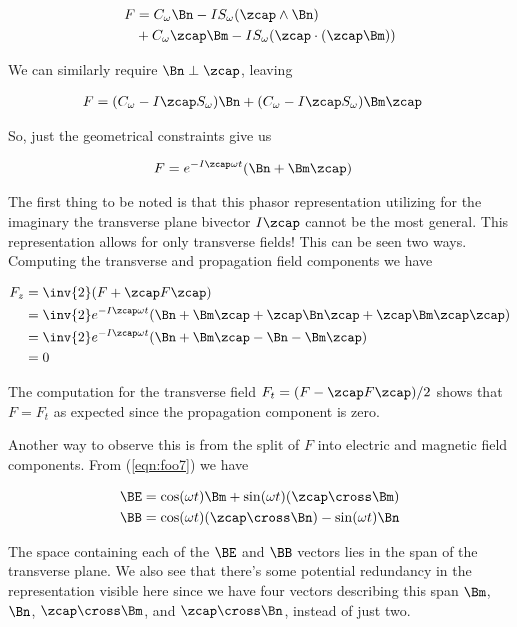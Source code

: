 \begin{align*}
F &= 
 C_\omega \Bn - I S_\omega (\zcap \wedge \Bn)  \\
&+ C_\omega \zcap \Bm - I S_\omega (\zcap \cdot (\zcap \Bm)) \\
\end{align*}

We can similarly require $\Bn \perp \zcap$, leaving

\begin{align}\label{eqn:foo7}
F &= (C_\omega - I \zcap S_\omega ) \Bn  + (C_\omega - I \zcap S_\omega) \Bm \zcap
\end{align}

So, just the geometrical constraints give us

\begin{align}\label{eqn:foo6}
F &= e^{-I\zcap \omega t}(\Bn + \Bm \zcap)
\end{align}

The first thing to be noted is that this phasor representation utilizing for the imaginary the transverse plane bivector $I\zcap$ cannot be the most general.  This representation allows for only transverse fields!  This can be seen two ways.  Computing the transverse and propagation field components we have

\begin{align*}
F_z 
&= \inv{2}(F + \zcap F \zcap) \\
&= 
\inv{2} e^{-I\zcap \omega t}( \Bn + \Bm \zcap + \zcap \Bn \zcap + \zcap \Bm \zcap \zcap) \\
&= 
\inv{2} e^{-I\zcap \omega t}( \Bn + \Bm \zcap - \Bn - \Bm \zcap ) \\
&= 0
\end{align*}

The computation for the transverse field $F_t = (F - \zcap F \zcap)/2$ shows that $F = F_t$ as expected since the propagation component is zero.

Another way to observe this is from the split of $F$ into electric and magnetic field components.  From (\ref{eqn:foo7}) we have

\begin{align}\label{eqn:foo8}
\BE &= \cos(\omega t) \Bm + \sin(\omega t) (\zcap \cross \Bm) \\
\BB &= \cos(\omega t) (\zcap \cross \Bn) - \sin(\omega t) \Bn
\end{align}

The space containing each of the $\BE$ and $\BB$ vectors lies in the span of the transverse plane.  We also see that there's some potential redundancy in the representation visible here since we have four vectors describing this span $\Bm$, $\Bn$, $\zcap \cross \Bm$, and $\zcap \cross \Bn$, instead of just two.

